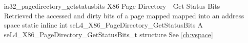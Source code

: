%
%
%
%

\apidoc
{ia32_pagedirectory_getstatusbits}
{X86 Page Directory - Get Status Bits}
{Retrieved the accessed and dirty bits of a page mapped mapped into an address space}
{static inline int seL4\_X86\_PageDirectory\_GetStatusBits}
{
}
{A seL4\_X86\_PageDirectory\_GetStatusBits\_t structure}
{See \autoref{ch:vspace}}

